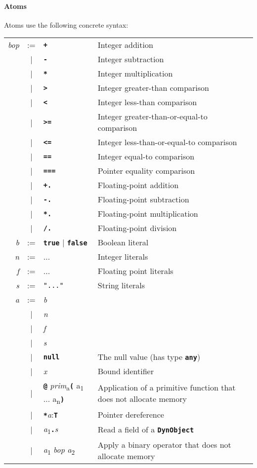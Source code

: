 \documentclass{book}
\newcommand{\kw}[1]{\textbf{\texttt{#1}}}
\newcommand{\metavar}[1]{\textit{#1}}
\begin{document}
\paragraph{Atoms}
Atoms use the following concrete syntax:

\begin{tabular}{rcll}
\metavar{bop} & := & \kw{+}   & Integer addition \\
              & |  & \kw{-}   & Integer subtraction \\
              & |  & \kw{*}   & Integer multiplication \\
              & |  & \kw{>}   & Integer greater-than comparison \\
              & |  & \kw{<}   & Integer less-than comparison \\
              & |  & \kw{>=}  & Integer greater-than-or-equal-to comparison \\
              & |  & \kw{<=}  & Integer less-than-or-equal-to comparison \\
              & |  & \kw{==}  & Integer equal-to comparison \\
              & |  & \kw{===} & Pointer equality comparison \\
              & |  & \kw{+.}  & Floating-point addition \\
              & |  & \kw{-.}  & Floating-point subtraction \\
              & |  & \kw{*.}  & Floating-point multiplication \\
              & |  & \kw{/.}  & Floating-point division \\
\metavar{b}   & := & \kw{true} | \kw{false} & Boolean literal \\
\metavar{n}   & := & ... & Integer literals \\
\metavar{f}   & := & ... & Floating point literals \\
\metavar{s}   & := & \texttt{"..."} & String literals \\
\metavar{a}   & := & \metavar{b} \\
              & |  & \metavar{n} \\
              & |  & \metavar{f} \\
              & |  & \metavar{s} \\
              & |  & \kw{null} & The null value (has type \kw{any}) \\
              & |  & \metavar{x} & Bound identifier \\
              & |  & \kw{@} \metavar{prim}\textsubscript{a}\kw{(} a\textsubscript{1} ... a\textsubscript{n}\kw{)}
                   & Application of a primitive function that does not allocate memory \\ 
              & |  & \kw{*}\metavar{a}{:}\kw{T}
                   & Pointer dereference \\
              & |  & \metavar{a}\textsubscript{1}\kw{.}\metavar{s}
                   & Read a field of a \kw{DynObject} \\
              & |  & \metavar{a}\textsubscript{1} \metavar{bop} \metavar{a}\textsubscript{2}
                   & Apply a binary operator that does not allocate memory
\end{tabular}
\end{document}
